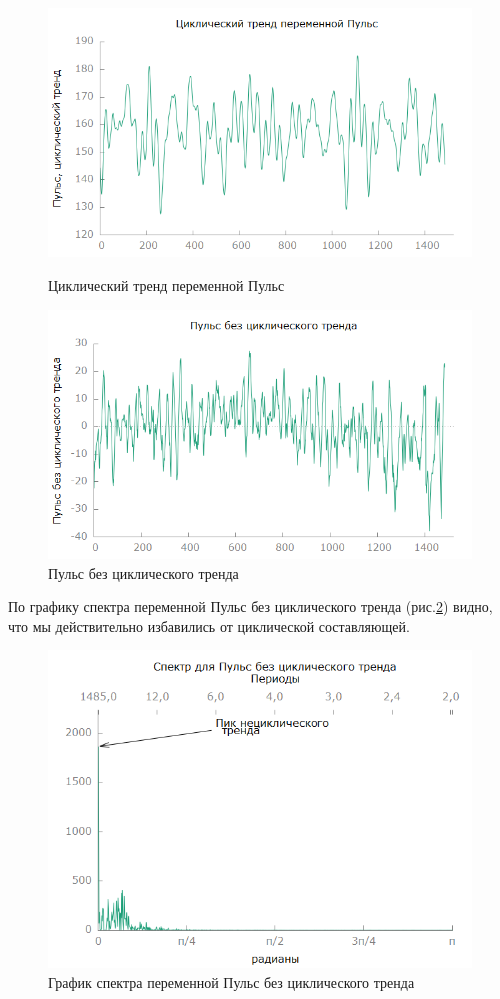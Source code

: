 \documentclass[a4paper,12pt]{article}
\begin{document}
\begin{figure}[H]
	\centering
\begin{minipage}{.5\textwidth}
	\centering
	\includegraphics[width=\linewidth]{../[graphics]/hr_trend0.png}
	\caption{Циклический тренд переменной Пульс}
	\label{fig:hr_trend0}
\end{minipage}%
\begin{minipage}{.5\textwidth}
	\centering
	\includegraphics[width=\linewidth]{../[graphics]/hr_error0.png}
	\caption{Пульс без циклического тренда}
	\label{fig:hr_error0}
\end{minipage}
\end{figure}

По графику спектра переменной Пульс без циклического тренда (рис.\ref{fig:hr_error0_spectr}) видно, что мы действительно избавились от циклической составляющей.

\begin{figure}[H]
	\centering
	\includegraphics[width=0.5\linewidth]{../[graphics]/hr_error0_spectr.png}
	\caption{График спектра переменной Пульс без циклического тренда}
	\label{fig:hr_error0_spectr}
\end{figure}
\end{document}
